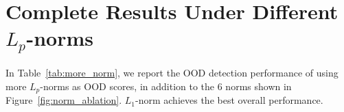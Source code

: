 \documentclass{article}
\begin{document}

\section{Complete Results Under Different $L_p$-norms}
\label{app:more_norm}
In Table~\ref{tab:more_norm}, we report the OOD detection performance of using more $L_p$-norms as OOD scores, in addition to the 6 norms shown in Figure~\ref{fig:norm_ablation}. $L_1$-norm achieves the best overall performance.
\end{document}
